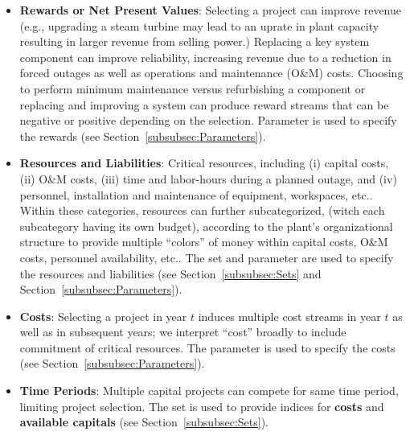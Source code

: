 \begin{itemize}
  \item \textbf{Rewards or Net Present Values}: Selecting a project can improve revenue (e.g.,
  upgrading a steam turbine may lead to an uprate in plant capacity resulting in larger
  revenue from selling power.) Replacing a key system component can improve reliability,
  increasing revenue due to a reduction in forced outages as well as operations and
  maintenance (O\&M) costs. Choosing to perform minimum maintenance versus refurbishing
  a component or replacing and improving a system can produce reward streams that
  can be negative or positive depending on the selection. Parameter
   is used to specify the rewards (see Section~\ref{subsubsec:Parameters}).

  \item \textbf{Resources and Liabilities}: Critical resources, including (i) capital costs,
  (ii) O\&M costs, (iii) time and labor-hours during a planned outage, and (iv) personnel,
  installation and maintenance of equipment, workspaces, etc.. Within these categories, resources
  can further subcategorized, (witch each subcategory having its own budget), according to the plant’s organizational
  structure to provide multiple “colors” of money within capital costs, O\&M costs,
  personnel availability, etc.. The set  and parameter
   are used to specify the resources and
  liabilities (see Section~\ref{subsubsec:Sets} and Section~\ref{subsubsec:Parameters}).

  \item \textbf{Costs}: Selecting a project in year $t$ induces multiple
  cost streams in year $t$ as well as in subsequent years; we interpret “cost” broadly to
  include commitment of critical resources. The parameter  is used to specify
  the costs (see Section~\ref{subsubsec:Parameters}).

  \item \textbf{Time Periods}: Multiple capital projects can compete for same time period,
  limiting project selection. The set  is used to provide indices for
  \textbf{costs} and \textbf{available capitals} (see Section~\ref{subsubsec:Sets}).


\end{itemize}
